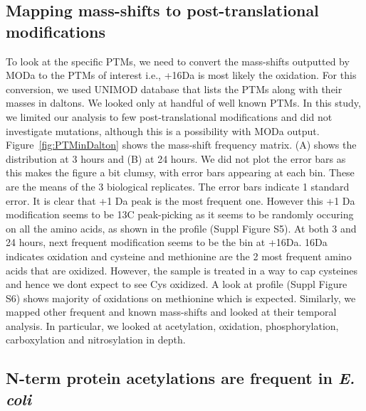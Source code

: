\documentclass[12pt]{article}
\begin{document}
\subsection{Mapping mass-shifts to post-translational modifications}
To look at the specific PTMs, we need to convert the mass-shifts outputted by MODa to the PTMs of interest i.e., +16Da is most likely the oxidation. For this conversion, we used UNIMOD database that lists the PTMs along with their masses in daltons. We looked only at handful of well known PTMs. In this study, we limited our analysis to few post-translational modifications and did not investigate mutations, although this is a possibility with MODa output.
Figure~\ref{fig:PTMinDalton} shows the mass-shift frequency matrix. (A) shows the distribution at 3 hours and (B) at 24 hours. We did not plot the error bars as this makes the figure a bit clumsy, with error bars appearing at each bin. These are the means of the 3 biological replicates. The error bars indicate 1 standard error. It is clear that +1 Da peak is the most frequent one. However this +1 Da modification seems to be 13C peak-picking as it seems to be randomly occuring on all the amino acids, as shown in the profile (Suppl Figure S5). At both 3 and 24 hours, next frequent modification seems to be the bin at +16Da. 16Da indicates oxidation and cysteine and methionine are the 2 most frequent amino acids that are oxidized. However, the sample is treated in a way to cap cysteines and hence we dont expect to see Cys oxidized. A look at profile (Suppl Figure S6) shows majority of oxidations on methionine which is expected. Similarly, we mapped other frequent and known mass-shifts and looked at their temporal analysis. In particular, we looked at  acetylation, oxidation, phosphorylation, carboxylation and nitrosylation in depth.

\subsection{N-term protein acetylations are frequent in \emph{E. coli}}
 
\end{document}
